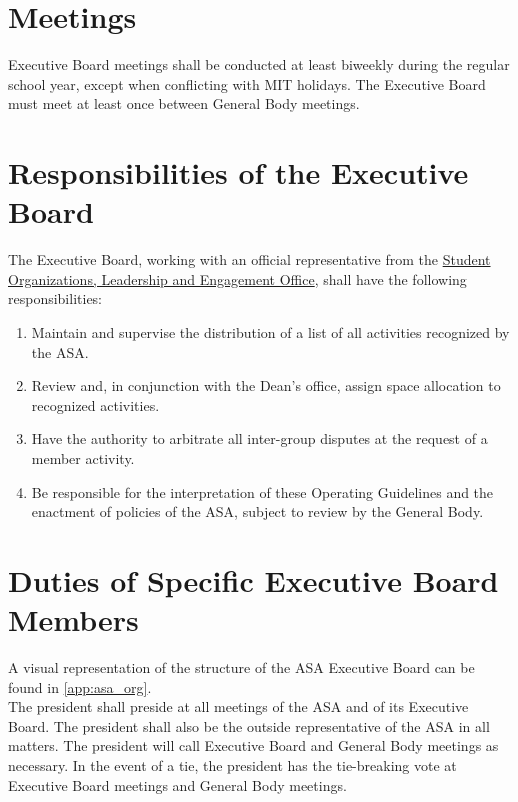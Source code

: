 \documentclass[12pt]{article}
\begin{document}
\section{Meetings}
Executive Board meetings shall be conducted at least biweekly during the regular school year, except
    when conflicting with MIT holidays.
The Executive Board must meet at least once between General Body meetings.

\section{Responsibilities of the Executive Board}
The Executive Board, working with an official representative from the
    \href{https://studentlife.mit.edu/life-campus/campus-student-activities/student-organizations-leadership-and-engagement}{Student Organizations, Leadership and Engagement Office},
    shall have the following responsibilities:
\begin{enumerate}
    \item Maintain and supervise the distribution of a list of all activities recognized by the ASA.
    
    \item Review and, in conjunction with the Dean's office, assign space allocation to
        recognized activities.
    
    \item Have the authority to arbitrate all inter-group disputes at the request of a member activity.
    
    \item Be responsible for the interpretation of these Operating Guidelines and the enactment of
        policies of the ASA, subject to review by the General Body.
\end{enumerate}

\section{Duties of Specific Executive Board Members}
A visual representation of the structure of the ASA Executive Board can be found in \ref{app:asa_org}.
\\

The president shall preside at all meetings of the ASA and of its Executive Board.
The president shall also be the outside representative of the ASA in all matters.
The president will call Executive Board and General Body meetings as necessary.
In the event of a tie, the president has the tie-breaking vote at Executive Board meetings and General Body meetings.
\\
\end{document}
